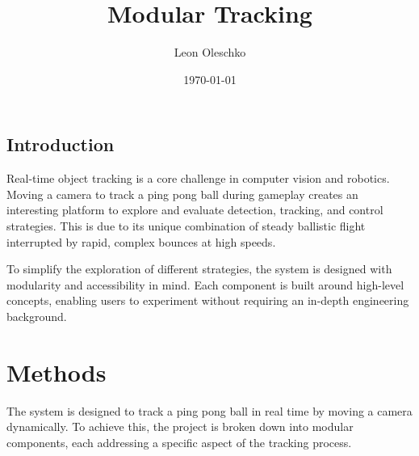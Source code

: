 \documentclass[
    parskip=half, 
    twoside=false,
    twocolumn=true,
    fontsize=12pt,
]{scrarticle}
\begin{document}
\title{Modular Tracking}
\author{Leon Oleschko}
\date{\dotdate\today}


\subsection*{Introduction}
Real-time object tracking is a core challenge in computer vision and robotics. Moving a camera to track a ping pong ball during gameplay creates an interesting platform to explore and evaluate detection, tracking, and control strategies. This is due to its unique combination of steady ballistic flight interrupted by rapid, complex bounces at high speeds.

To simplify the exploration of different strategies, the system is designed with modularity and accessibility in mind. Each component is built around high-level concepts, enabling users to experiment without requiring an in-depth engineering background.


\section{Methods}
The system is designed to track a ping pong ball in real time by moving a camera dynamically. To achieve this, the project is broken down into modular components, each addressing a specific aspect of the tracking process. 
\end{document}
